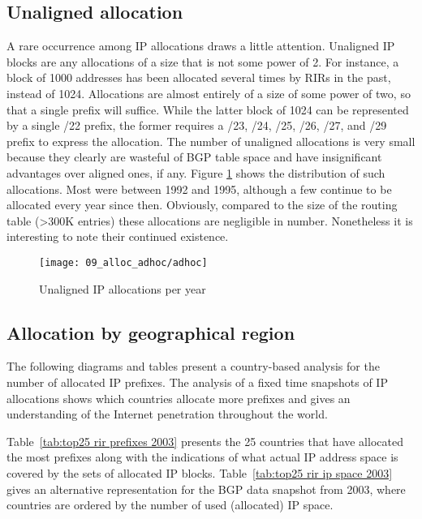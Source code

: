 \subsection{Unaligned allocation}

A rare occurrence among IP allocations draws a little attention.  Unaligned IP blocks are any allocations of a size that is not some power of 2. For
instance, a block of 1000 addresses has been allocated several times by RIRs in the past, instead of 1024. Allocations are almost entirely of a size of some power of two, so that a single prefix will
suffice. While the latter block of 1024 can be represented by a single /22 prefix, the former requires a /23, /24, /25, /26, /27, and /29 prefix to express the allocation.
The number of unaligned allocations is very small because they clearly are
wasteful of BGP table space and have insignificant advantages over aligned ones, if any. Figure
\ref{fig:unaligned IP allocations} shows the distribution of such allocations.
Most were between 1992 and 1995, although a few continue to be allocated every
year since then. Obviously, compared to the size of the routing table (>300K entries) these allocations are negligible in number.  Nonetheless it is interesting to note their continued existence.

\begin{figure}[htbp]
 	\centering
 		\texttt{[image: 09\_alloc\_adhoc/adhoc]}
	\caption{Unaligned IP allocations per year}
 	\label{fig:unaligned IP allocations}
\end{figure}

\subsection{Allocation by geographical region}

The following diagrams and tables present a country-based analysis for the
number of allocated IP prefixes. The analysis of a fixed time snapshots of IP
allocations shows which countries allocate more prefixes and gives an
understanding of the Internet penetration throughout the world.

Table~\ref{tab:top25 rir prefixes 2003} presents the 25 countries that have
allocated the most prefixes along with the indications of what actual IP
address space is covered by the sets of allocated IP blocks.
Table~\ref{tab:top25 rir ip space 2003} gives an alternative representation
for the BGP data snapshot from 2003, where countries are ordered by the number
of used (allocated) IP space.

